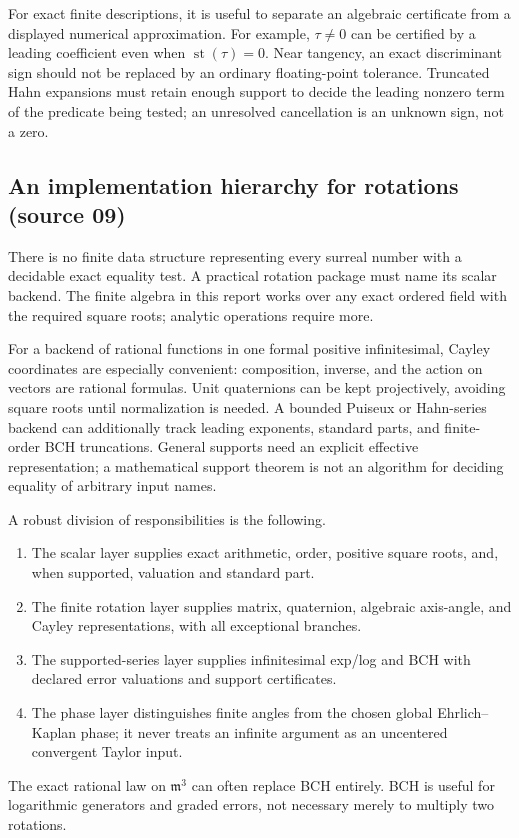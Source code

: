 \documentclass[11pt,letterpaper]{article}
\numberwithin{equation}{section}
\theoremstyle{definition}
\theoremstyle{remark}
\newcommand{\mm}{\mathfrak m}
\newcommand{\st}{\operatorname{st}}
\begin{document}
For exact finite descriptions, it is useful to separate an algebraic
certificate from a displayed numerical approximation. For example,
$\tau\ne0$ can be certified by a leading coefficient even when
$\st(\tau)=0$. Near tangency, an exact discriminant sign should not
be replaced by an ordinary floating-point tolerance. Truncated Hahn
expansions must retain enough support to decide the leading nonzero
term of the predicate being tested; an unresolved cancellation is an
unknown sign, not a zero.

\subsection{An implementation hierarchy for rotations (source 09)}\label{e3:sub:impl09}

There is no finite data structure representing every surreal number with a
decidable exact equality test. A practical rotation package must name its scalar
backend. The finite algebra in this report works over any exact ordered field
with the required square roots; analytic operations require more.

For a backend of rational functions in one formal positive infinitesimal,
Cayley coordinates are especially convenient: composition, inverse, and the
action on vectors are rational formulas. Unit quaternions can be kept
projectively, avoiding square roots until normalization is needed. A bounded
Puiseux or Hahn-series backend can additionally track leading exponents,
standard parts, and finite-order BCH truncations. General supports need an
explicit effective representation; a mathematical support theorem is not an
algorithm for deciding equality of arbitrary input names.

A robust division of responsibilities is the following.
\begin{enumerate}[label=\textup{\arabic*.}]
\item The scalar layer supplies exact arithmetic, order, positive square roots,
      and, when supported, valuation and standard part.
\item The finite rotation layer supplies matrix, quaternion, algebraic
      axis-angle, and Cayley representations, with all exceptional branches.
\item The supported-series layer supplies infinitesimal exp/log and BCH with
      declared error valuations and support certificates.
\item The phase layer distinguishes finite angles from the chosen global
      Ehrlich--Kaplan phase; it never treats an infinite argument as an
      uncentered convergent Taylor input.
\end{enumerate}
The exact rational law on \(\mm^3\) can often replace BCH entirely. BCH is
useful for logarithmic generators and graded errors, not necessary merely to
multiply two rotations.
\end{document}
